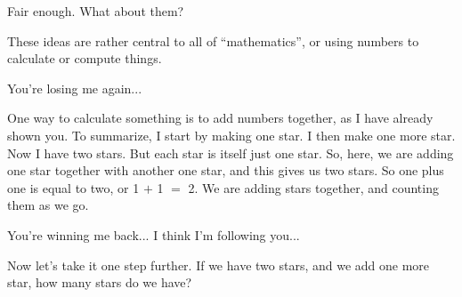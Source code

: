 \documentclass[main.tex]{subfiles}
\begin{document}
\par \Maia Fair enough.  What about them?

\par \Pleione These ideas are rather central to all of ``mathematics'', or using numbers to calculate or compute things.



\par \Maia You're losing me again...

\par \Pleione One way to calculate something is to add numbers together, as I have already shown you.  To summarize, I start by making one star.  I then make one more star.  Now I have two stars.  But each star is itself just one star.  So, here, we are adding one star together with another one star, and this gives us two stars.  So one plus one is equal to two, or 1 $+$ 1 $=$ 2.  We are adding stars together, and counting them as we go.

\par \Maia You're winning me back...  I think I'm following you...

\par \Pleione Now let's take it one step further.  If we have two stars, and we add one more star, how many stars do we have?

 
\end{document}
